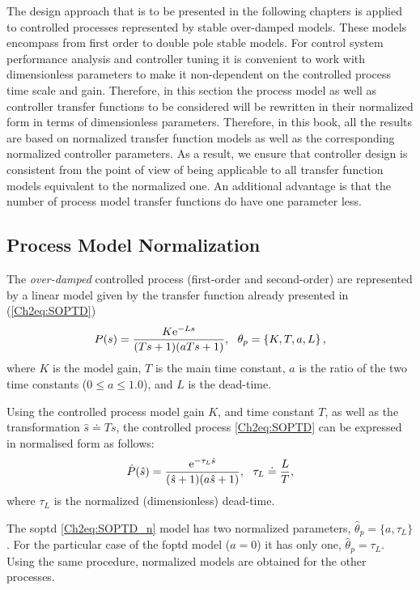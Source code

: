 The design approach that is to be presented in the following chapters is applied to controlled processes represented by stable over-damped models. These models encompass from first order to double pole stable models. For control system performance analysis and controller tuning it is convenient to work with dimensionless parameters to make it non-dependent on the controlled process time scale and gain. Therefore, in this section the process model as well as controller transfer functions to be considered will be rewritten in their normalized form in terms of dimensionless parameters.  Therefore, in this book, all the results are based on normalized transfer function models as well as the corresponding normalized controller parameters. As a result, we ensure that controller design is consistent from the point of view of being applicable to all transfer function models equivalent to the normalized one. An additional advantage is that the number of process model transfer functions do have one parameter less.

\subsection{Process Model Normalization}
\label{sec:4.1}

The \emph{over-damped} controlled process (first-order and second-order) are represented by a linear model given by the transfer function already presented in (\ref{Ch2eq:SOPTD})
%
\begin{equation}
	P(s) = \frac{K \me^{-L s}}{(T s+1)(a T s+1)}, \ \ \theta_p=\left\{K, T, a, L \right\}, 
\end{equation}
%
where $K$ is the model gain, $T$ is the main time constant, $a$ is the ratio of the two time constants ($0 \leq a \leq 1.0$), and $L$ is the dead-time.

Using the controlled process model gain $K$, and time constant $T$, as well as the transformation $\hat s \doteq T s$, the controlled process \eqref{Ch2eq:SOPTD} can be expressed in normalised form as follows:
\begin{equation}
	\hat P(\hat s) = \frac{\mathrm{e}^{-\tau_L \hat s}}{(\hat s +1)(a \hat s +1)}, \ \ \tau_L \doteq \frac{L}{T}, 
	\label{Ch2eq:SOPTD_n}
\end{equation}
%
where $\tau_L$ is the normalized (dimensionless) dead-time.

The \gls{soptd} \eqref{Ch2eq:SOPTD_n} model has two normalized parameters, $\hat{\theta}_p = \{a, \tau_L\}$.  For the particular case of the \gls{foptd} model ($a=0$) it has only one, $\hat{\theta}_p = \tau_L$. Using the same procedure, normalized models are obtained for the other processes.
%
